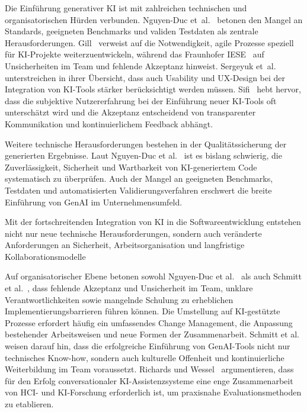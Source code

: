 Die Einführung generativer KI ist mit zahlreichen technischen und
organisatorischen Hürden verbunden. Nguyen-Duc
et~al.~\cite{nguyen-duc_generative_2023} betonen den Mangel an Standards,
geeigneten Benchmarks und validen Testdaten als zentrale Herausforderungen.
Gill~\cite{Gil} verweist auf die Notwendigkeit, agile Prozesse speziell für
KI-Projekte weiterzuentwickeln, während das Fraunhofer IESE~\cite{Sie} auf
Unsicherheiten im Team und fehlende Akzeptanz hinweist. Sergeyuk
et~al.~\cite{Ser} unterstreichen in ihrer Übersicht, dass auch Usability und
UX-Design bei der Integration von KI-Tools stärker berücksichtigt werden
müssen. Sifi~\cite{sifi_how_2025} hebt hervor, dass die subjektive
Nutzererfahrung bei der Einführung neuer KI-Tools oft unterschätzt wird und die
Akzeptanz entscheidend von transparenter Kommunikation und kontinuierlichem
Feedback abhängt.

Weitere technische Herausforderungen bestehen in der Qualitätssicherung der
generierten Ergebnisse. Laut Nguyen-Duc et
al.~\cite{nguyen-duc_generative_2023} ist es bislang schwierig, die
Zuverlässigkeit, Sicherheit und Wartbarkeit von KI-generiertem Code
systematisch zu überprüfen. Auch der Mangel an geeigneten Benchmarks, Testdaten
und automatisierten Validierungsverfahren erschwert die breite Einführung von
GenAI im Unternehmensumfeld.

Mit der fortschreitenden Integration von KI in die Softwareentwicklung
entstehen nicht nur neue technische Herausforderungen, sondern auch veränderte
Anforderungen an Sicherheit, Arbeitsorganisation und langfristige
Kollaborationsmodelle \cite{hazra_ai_2025}

Auf organisatorischer Ebene betonen sowohl Nguyen-Duc et
al.~\cite{nguyen-duc_generative_2023} als auch Schmitt et
al.~\cite{schmitt_generative_2024}, dass fehlende Akzeptanz und Unsicherheit im
Team, unklare Verantwortlichkeiten sowie mangelnde Schulung zu erheblichen
Implementierungsbarrieren führen können. Die Umstellung auf KI-gestützte
Prozesse erfordert häufig ein umfassendes Change Management, die Anpassung
bestehender Arbeitsweisen und neue Formen der Zusammenarbeit. Schmitt et
al.~\cite{schmitt_generative_2024} weisen darauf hin, dass die erfolgreiche
Einführung von GenAI-Tools nicht nur technisches Know-how, sondern auch
kulturelle Offenheit und kontinuierliche Weiterbildung im Team voraussetzt.
Richards und Wessel~\cite{richards_bridging_2025} argumentieren, dass für den
Erfolg conversationaler KI-Assistenzsysteme eine enge Zusammenarbeit von HCI-
und KI-Forschung erforderlich ist, um praxisnahe Evaluationsmethoden zu
etablieren.

